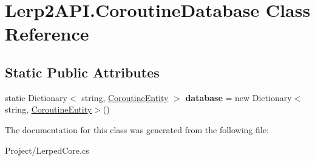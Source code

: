 \hypertarget{class_lerp2_a_p_i_1_1_coroutine_database}{}\section{Lerp2\+A\+P\+I.\+Coroutine\+Database Class Reference}
\label{class_lerp2_a_p_i_1_1_coroutine_database}
\subsection*{Static Public Attributes}
\begin{DoxyCompactItemize}
\item 
\mbox{\label{class_lerp2_a_p_i_1_1_coroutine_database_ac805340e0b44a86b2b4265c553ca8b76}} 
static Dictionary$<$ string, \hyperlink{class_lerp2_a_p_i_1_1_coroutine_entity}{Coroutine\+Entity} $>$ {\bfseries database} = new Dictionary$<$string, \hyperlink{class_lerp2_a_p_i_1_1_coroutine_entity}{Coroutine\+Entity}$>$()
\end{DoxyCompactItemize}


The documentation for this class was generated from the following file\+:\begin{DoxyCompactItemize}
\item 
Project/Lerped\+Core.\+cs\end{DoxyCompactItemize}
